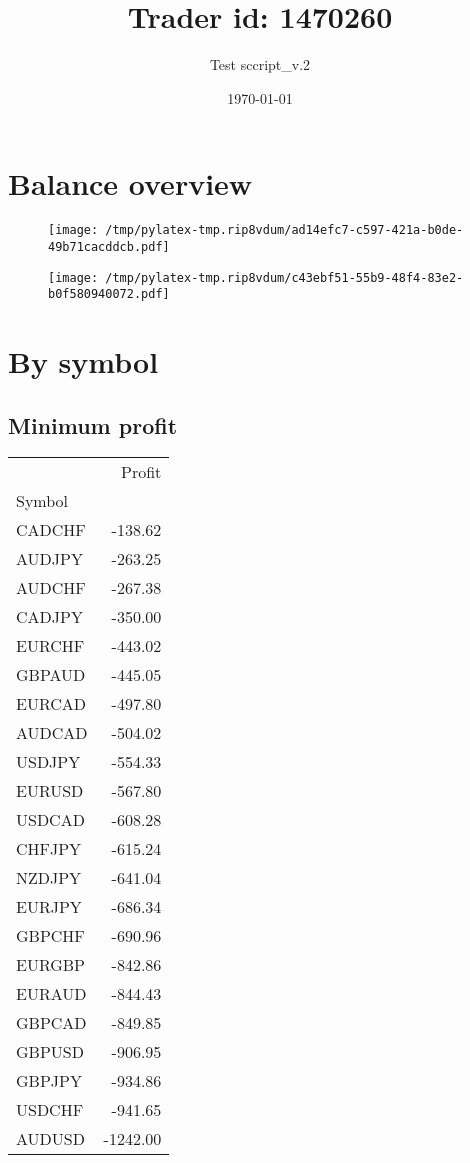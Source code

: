 \documentclass{article}%
\title{Trader id: 1470260}%
\author{Test sccript\_v.2}%
\date{\today}%
\begin{document}
%
\normalsize%
\maketitle%
\section{Balance overview}%
\label{sec:Balanceoverview}%


\begin{figure}[htbp]%
\centering%
\texttt{[image: /tmp/pylatex-tmp.rip8vdum/ad14efc7-c597-421a-b0de-49b71cacddcb.pdf]}%
\end{figure}

%


\begin{figure}[htbp]%
\centering%
\texttt{[image: /tmp/pylatex-tmp.rip8vdum/c43ebf51-55b9-48f4-83e2-b0f580940072.pdf]}%
\end{figure}

%
\section{By symbol}%
\label{sec:Bysymbol}%
\subsection{Minimum profit }%
\label{subsec:Minimumprofit}%
\begin{tabular}{lr}
\toprule
{} &   Profit \\
Symbol &          \\
\midrule
CADCHF &  -138.62 \\
AUDJPY &  -263.25 \\
AUDCHF &  -267.38 \\
CADJPY &  -350.00 \\
EURCHF &  -443.02 \\
GBPAUD &  -445.05 \\
EURCAD &  -497.80 \\
AUDCAD &  -504.02 \\
USDJPY &  -554.33 \\
EURUSD &  -567.80 \\
USDCAD &  -608.28 \\
CHFJPY &  -615.24 \\
NZDJPY &  -641.04 \\
EURJPY &  -686.34 \\
GBPCHF &  -690.96 \\
EURGBP &  -842.86 \\
EURAUD &  -844.43 \\
GBPCAD &  -849.85 \\
GBPUSD &  -906.95 \\
GBPJPY &  -934.86 \\
USDCHF &  -941.65 \\
AUDUSD & -1242.00 \\
\bottomrule
\end{tabular}
%
\end{document}
